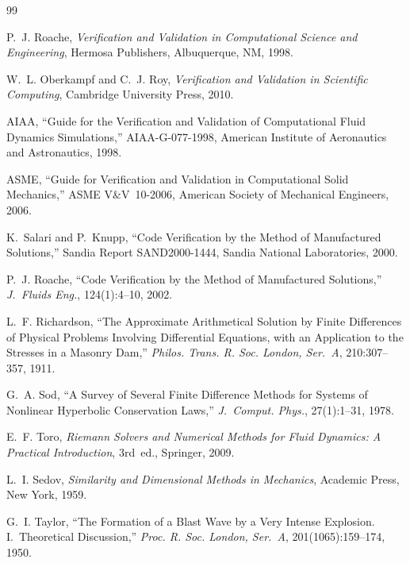 \documentclass[11pt,a4paper]{article}
\begin{document}
\newpage



\begin{thebibliography}{99}


P.~J. Roache,
\textit{Verification and Validation in Computational Science and Engineering},
Hermosa Publishers, Albuquerque, NM, 1998.

W.~L. Oberkampf and C.~J. Roy,
\textit{Verification and Validation in Scientific Computing},
Cambridge University Press, 2010.

AIAA,
``Guide for the Verification and Validation of Computational Fluid Dynamics
Simulations,'' AIAA-G-077-1998, American Institute of Aeronautics and
Astronautics, 1998.

ASME,
``Guide for Verification and Validation in Computational Solid Mechanics,''
ASME V\&V~10-2006, American Society of Mechanical Engineers, 2006.

K.~Salari and P.~Knupp,
``Code Verification by the Method of Manufactured Solutions,''
Sandia Report SAND2000-1444, Sandia National Laboratories, 2000.

P.~J. Roache,
``Code Verification by the Method of Manufactured Solutions,''
\textit{J.~Fluids Eng.}, 124(1):4--10, 2002.

L.~F. Richardson,
``The Approximate Arithmetical Solution by Finite Differences of Physical
Problems Involving Differential Equations, with an Application to the Stresses
in a Masonry Dam,''
\textit{Philos. Trans. R. Soc. London, Ser.~A}, 210:307--357, 1911.


G.~A. Sod,
``A Survey of Several Finite Difference Methods for Systems of Nonlinear
Hyperbolic Conservation Laws,''
\textit{J.~Comput. Phys.}, 27(1):1--31, 1978.

E.~F. Toro,
\textit{Riemann Solvers and Numerical Methods for Fluid Dynamics: A Practical
Introduction}, 3rd~ed., Springer, 2009.


L.~I. Sedov,
\textit{Similarity and Dimensional Methods in Mechanics},
Academic Press, New York, 1959.

G.~I. Taylor,
``The Formation of a Blast Wave by a Very Intense Explosion. I.~Theoretical
Discussion,''
\textit{Proc. R. Soc. London, Ser.~A}, 201(1065):159--174, 1950.


\end{thebibliography}
\end{document}
